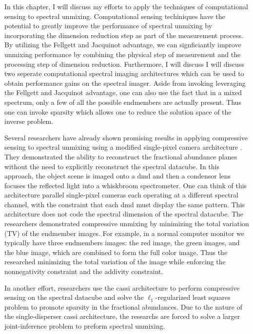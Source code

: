 In this chapter, I will discuss my efforts to apply the techniques of computational sensing to spectral unmixing. Computational sensing techiniques have the potential to greatly improve the performance of spectral unmixing by incorporating the dimension reduction step as part of the measurement process. By utilizing the Fellgett and Jacquinot advantage, we can signficiantly improve unmixing performance by combining the physical step of measurement and the processing step of dimension reduction. Furthermore, I will discuss I will discuss two seperate computational spectral imaging architectures which can be used to obtain performance gains on the spectral imager. Aside from invoking leveraging the Fellgett and Jacquinot advantage, one can also use the fact that in a mixed spectrum, only a few of all the possible endmembers are actually present. Thus one can invoke sparsity which allows one to reduce the solution space of the inverse problem.


Several researchers have already shown promising results in applying compressive sensing to spectral unmixing using a modified single-pixel camera architecture \cite{li2012compressive}. They demonstrated the ability to reconstruct the fractional abundance planes without the need to explicitly reconstruct the spectral datacube. In this approach, the object scene is imaged onto a \gls{dmd} and then a condensor lens focuses the reflected light into a whiskbroom spectrometer. One can think of this architecture parallel single-pixel cameras each operating at a different spectral channel, with the constraint that each \gls{dmd} must display the same pattern. This architecture does not code the spectral dimension of the spectral datacube. The researchers demonstrated compressive unmixing by minimizing the total variation (TV) of the endmember images. For example, in a normal computer monitor we typically have three endmembers images: the red image, the green images, and the blue image, which are combined to form the full color image. Thus the researched minimizing the total variation of the image while enforcing the nonnegativity constraint and the addivity constraint. 

In another effort, researchers use the \acrfull{cassi} architecture to perform compressive sensing on the spectral datacube and solve the $\ell_1$-regularized least squares problem to promote sparsity in the fractional abundances. Due to the nature of the single-disperser \gls{cassi} architecture, the researchs are forced to solve a larger joint-inference problem to preform spectral unmixing.

